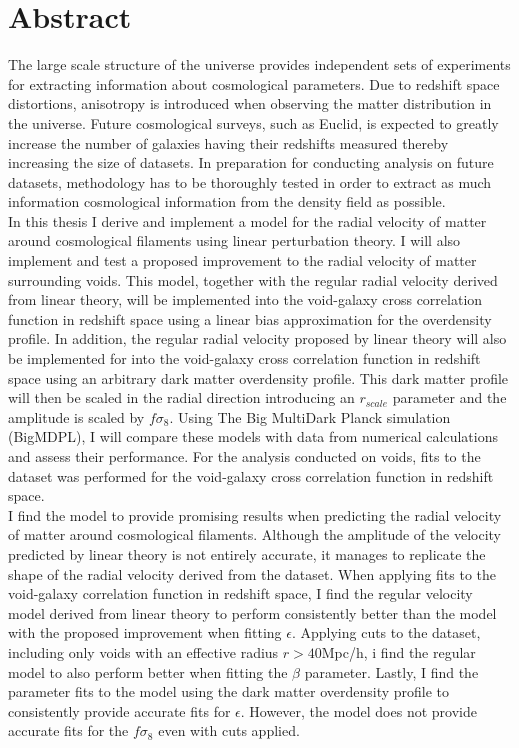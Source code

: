 \chapter*{Abstract}
The large scale structure of the universe provides independent sets of experiments for extracting information about cosmological parameters. Due to redshift space distortions, anisotropy is introduced when observing the matter distribution in the universe.
Future cosmological surveys, such as Euclid, is expected to greatly increase the number of galaxies having their redshifts measured thereby increasing the size of datasets. In preparation for conducting analysis on future datasets, methodology has to be thoroughly tested in order to extract as much information cosmological information from the density field as possible.\\\indent
In this thesis I derive and implement a model for the radial velocity of matter around cosmological filaments using linear perturbation theory. I will also implement and test a proposed improvement to the radial velocity of matter surrounding voids\cite{Achitouv_streaming}. This model, together with the regular radial velocity derived from linear theory, will be implemented into the void-galaxy cross correlation function in redshift space using a linear bias approximation for the overdensity profile. In addition, the regular radial velocity proposed by linear theory will also be implemented for into the void-galaxy cross correlation function in redshift space using an arbitrary dark matter overdensity profile. This dark matter profile will then be scaled in the radial direction introducing an $r_{scale}$ parameter and the amplitude is scaled by $f\sigma_8$. Using The Big MultiDark Planck simulation (BigMDPL)\cite{Multidark_dataset}, I will compare these models with data from numerical calculations and assess their performance. For the analysis conducted on voids, fits to the dataset was performed for the void-galaxy cross correlation function in redshift space. 
\\\indent
I find the model to provide promising results when predicting the radial velocity of matter around cosmological filaments. Although the amplitude of the velocity predicted by linear theory is not entirely accurate, it manages to replicate the shape of the radial velocity derived from the dataset. When applying fits to the void-galaxy correlation function in redshift space, I find the regular velocity model derived from linear theory to perform consistently better than the model with the proposed improvement when fitting $\epsilon$. Applying cuts to the dataset, including only voids with an effective radius $r>40$Mpc/h, i find the regular model to also perform better when fitting the $\beta$ parameter. Lastly, I find the parameter fits to the model using the dark matter overdensity profile to consistently provide accurate fits for $\epsilon$. However, the model does not provide accurate fits for the $f\sigma_8$ even with cuts applied.
\\\indent